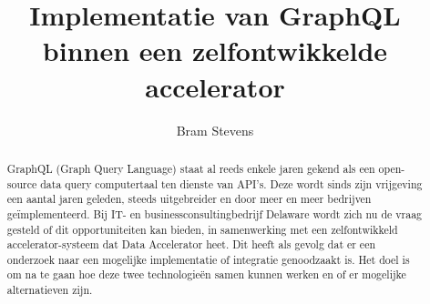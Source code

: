 \documentclass{hogent-article}
\title{Implementatie van GraphQL binnen een zelfontwikkelde accelerator}
\author{Bram Stevens}
\begin{document}
\begin{abstract}
GraphQL (Graph Query Language) staat al reeds enkele jaren gekend als een open-source data query computertaal ten dienste van API's. Deze wordt sinds zijn vrijgeving een aantal jaren geleden, steeds uitgebreider en door meer en meer bedrijven geïmplementeerd. Bij IT- en businessconsultingbedrijf Delaware wordt zich nu de vraag gesteld of dit opportuniteiten kan bieden, in samenwerking met een zelfontwikkeld accelerator-systeem dat Data Accelerator heet. Dit heeft als gevolg dat er een onderzoek naar een mogelijke implementatie of integratie genoodzaakt is. Het doel is om na te gaan hoe deze twee technologieën samen kunnen werken en of er mogelijke alternatieven zijn.
\end{abstract}

\tableofcontents



\printbibliography[heading=bibintoc]
\end{document}

